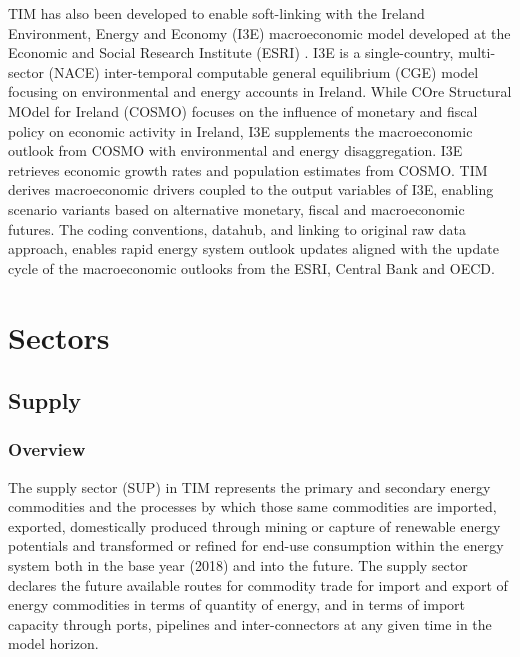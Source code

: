 \documentclass[journal abbreviation, manuscript]{copernicus}
\begin{document}
TIM has also been developed to enable soft-linking with the Ireland Environment, Energy and Economy (I3E) macroeconomic model developed at the Economic and Social Research Institute (ESRI) \citep{Yakut2020}. I3E is a single-country, multi-sector (NACE) inter-temporal computable general equilibrium (CGE) model focusing on environmental and energy accounts in Ireland. While COre Structural MOdel for Ireland (COSMO) focuses on the influence of monetary and fiscal policy on economic activity in Ireland, I3E supplements the macroeconomic outlook from COSMO with environmental and energy disaggregation. I3E retrieves economic growth rates and population estimates from COSMO. TIM derives macroeconomic drivers coupled to the output variables of I3E, enabling scenario variants based on alternative monetary, fiscal and macroeconomic futures. The coding conventions, datahub, and linking to original raw data approach, enables rapid energy system outlook updates aligned with the update cycle of the macroeconomic outlooks from the ESRI, Central Bank and OECD.


\section{Sectors}
\label{s:sectors}

\subsection{Supply}
\label{ss:supply}
\subsubsection{Overview}
The supply sector (SUP) in TIM represents the primary and secondary energy commodities and the processes by which those same commodities are imported, exported, domestically produced through mining or capture of renewable energy potentials and transformed or refined for end-use consumption within the energy system both in the base year (2018) and into the future. The supply sector declares the future available routes for commodity trade for import and export of energy commodities in terms of quantity of energy, and in terms of import capacity through ports, pipelines and inter-connectors at any given time in the model horizon. 
\end{document}

